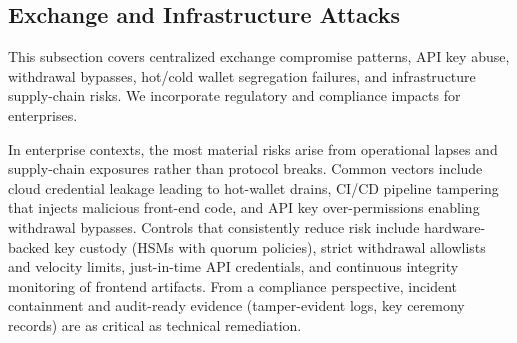 \subsection{Exchange and Infrastructure Attacks}
This subsection covers centralized exchange compromise patterns, API key abuse, withdrawal bypasses, hot/cold wallet segregation failures, and infrastructure supply-chain risks. We incorporate regulatory and compliance impacts for enterprises.

In enterprise contexts, the most material risks arise from operational lapses and supply-chain exposures rather than protocol breaks. Common vectors include cloud credential leakage leading to hot-wallet drains, CI/CD pipeline tampering that injects malicious front-end code, and API key over-permissions enabling withdrawal bypasses. Controls that consistently reduce risk include hardware-backed key custody (HSMs with quorum policies), strict withdrawal allowlists and velocity limits, just-in-time API credentials, and continuous integrity monitoring of frontend artifacts. From a compliance perspective, incident containment and audit-ready evidence (tamper-evident logs, key ceremony records) are as critical as technical remediation.